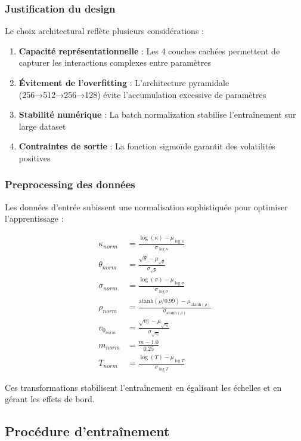 \subsubsection{Justification du design}

Le choix architectural reflète plusieurs considérations :

\begin{enumerate}
\item \textbf{Capacité représentationnelle} : Les 4 couches cachées permettent de capturer les interactions complexes entre paramètres
\item \textbf{Évitement de l'overfitting} : L'architecture pyramidale (256→512→256→128) évite l'accumulation excessive de paramètres
\item \textbf{Stabilité numérique} : La batch normalization stabilise l'entraînement sur large dataset
\item \textbf{Contraintes de sortie} : La fonction sigmoïde garantit des volatilités positives
\end{enumerate}

\subsubsection{Preprocessing des données}

Les données d'entrée subissent une normalisation sophistiquée pour optimiser l'apprentissage :

\begin{align}
\kappa_{norm} &= \frac{\log(\kappa) - \mu_{\log \kappa}}{\sigma_{\log \kappa}} \\
\theta_{norm} &= \frac{\sqrt{\theta} - \mu_{\sqrt{\theta}}}{\sigma_{\sqrt{\theta}}} \\
\sigma_{norm} &= \frac{\log(\sigma) - \mu_{\log \sigma}}{\sigma_{\log \sigma}} \\
\rho_{norm} &= \frac{\text{atanh}(\rho/0.99) - \mu_{\text{atanh}(\rho)}}{\sigma_{\text{atanh}(\rho)}} \\
v_0_{norm} &= \frac{\sqrt{v_0} - \mu_{\sqrt{v_0}}}{\sigma_{\sqrt{v_0}}} \\
m_{norm} &= \frac{m - 1.0}{0.25} \\
T_{norm} &= \frac{\log(T) - \mu_{\log T}}{\sigma_{\log T}}
\end{align}

Ces transformations stabilisent l'entraînement en égalisant les échelles et en gérant les effets de bord.

\subsection{Procédure d'entraînement}

